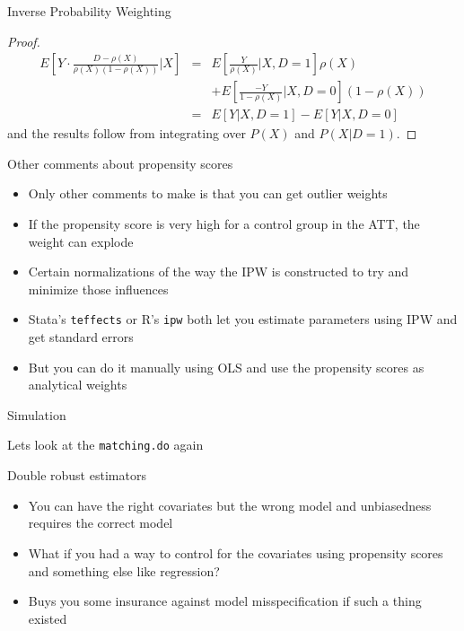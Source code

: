 \documentclass{beamer}
\begin{document}
\begin{frame}{Inverse Probability Weighting}

	\begin{proof}
	\begin{eqnarray*}
	E \left[ Y \cdot \frac{D-\rho(X)}{\rho(X)(1-\rho(X))} \Big\vert X \right] &=& E \left[ \frac{Y}{\rho(X)} \Big\vert X,D=1 \right] \rho(X) \\
	&& + E\left[ \frac{-Y}{1-\rho(X)} \Big\vert X,D=0 \right](1-\rho(X)) \\
	&=& E[Y|X,D=1] - E[Y|X,D=0]
	\end{eqnarray*}and the results follow from integrating over $P(X)$ and $P(X|D=1)$.
	\end{proof}

\end{frame}

\begin{frame}{Other comments about propensity scores}

\begin{itemize}

\item Only other comments to make is that you can get outlier weights
\item If the propensity score is very high for a control group in the ATT, the weight can explode
\item Certain normalizations of the way the IPW is constructed to try and minimize those influences
\item Stata's \texttt{teffects} or R's \texttt{ipw} both let you estimate parameters using IPW and get standard errors
\item But you can do it manually using OLS and use  the propensity scores as analytical weights

\end{itemize}

\end{frame}

\begin{frame}{Simulation}

Lets look at the \texttt{matching.do} again

\end{frame}


\begin{frame}{Double robust estimators}

\begin{itemize}
\item You can have the right covariates but the wrong model and unbiasedness requires the correct model
\item What if you had a way to control for the covariates using propensity scores and something else like regression?
\item Buys you some insurance against model misspecification if such a thing existed
\end{itemize}

\end{frame}
\end{document}
